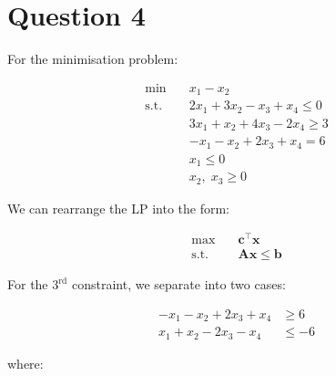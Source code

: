 \documentclass[12pt]{article}
\begin{document}


\newpage

\newpage

\section*{Question 4}
For the minimisation problem: 

\begin{align*}
    \min \quad & x_{1}-x_{2} \\ 
    \text{s.t.} \quad & 2 x_{1} + 3 x_{2} - x_{3} + x_{4} \leq 0 \\ 
    & 3 x_{1} + x_{2} + 4 x_{3} - 2 x_{4} \geq 3 \\ 
    & - x_{1} - x_{2} + 2 x_{3} + x_{4} = 6 \\ 
    & x_{1} \leq 0 \\ 
    & x_{2},\; x_{3} \geq 0 
\end{align*}

\noindent We can rearrange the LP into the form: 

\begin{align*}
    \max \quad & \mathbf{c}^{\top} \mathbf{x} \\ 
    \text{s.t.} \quad & \mathbf{A} \mathbf{x} \leq \mathbf{b}
\end{align*}

\noindent For the $3^{\text{rd}}$ constraint, we separate into two cases: 

\begin{align*}
    - x_{1} - x_{2} + 2 x_{3} + x_{4} & \geq 6 \\
    x_{1} + x_{2} -2 x_{3} -x_{4} & \leq -6
\end{align*}

\noindent where:
\end{document}
